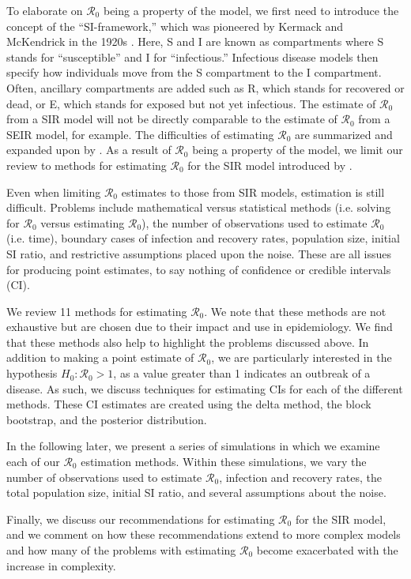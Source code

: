 \message{ !name(draft_v13.tex)}\documentclass[12pt]{article}
\newcommand{\wxxsir}{11 }
\newcommand{\rr}{\ensuremath{\mathcal{R}_0}}
\begin{document}
To elaborate on $\rr$ being a property of the model, we first need to introduce the concept of the ``SI-framework,'' which was pioneered by Kermack and McKendrick in the 1920s \citep{getz2006}.   Here, S and I are known as compartments where S stands for ``susceptible'' and I for ``infectious.'' Infectious disease models then specify how individuals move from the S compartment to the I compartment.  Often, ancillary compartments are added such as R, which stands for recovered or dead, or E, which stands for exposed but not yet infectious.  The estimate of $\rr$ from a SIR model will not be directly comparable to the estimate of $\rr$ from a SEIR model, for example.  The difficulties of estimating $\rr$ are summarized and expanded upon by \cite{li2011}.   As a result of $\rr$ being a property of the model, we limit our review to methods for estimating $\rr$ for the SIR model introduced by \cite{Kermack700}.

Even when limiting $\rr$ estimates to those from SIR models, estimation is still difficult.  Problems include mathematical versus statistical methods (i.e. solving for $\rr$ versus estimating $\rr$), the number of observations used to estimate $\rr$ (i.e. time), boundary cases of infection and recovery rates, population size, initial SI ratio, and restrictive assumptions placed upon the noise.  These are all issues for producing point estimates, to say nothing of confidence or credible intervals (CI).

We review \wxxsir methods for estimating $\rr$.  We note that these methods are not exhaustive but are chosen due to their impact and use in epidemiology.  We find that these methods also help to highlight the problems discussed above.  In addition to making a point estimate of $\rr$, we are particularly interested in the hypothesis  $H_0: \rr > 1$, as a value greater than 1 indicates an outbreak of a disease.  As such, we discuss techniques for estimating CIs for each of the different methods.  These CI estimates are created using the delta method, the block bootstrap, and the posterior distribution.

In the following later, we present a series of simulations in which we examine each of our $\rr$ estimation methods.  Within these simulations, we vary the number of observations used to estimate $\rr$, infection and recovery rates, the total population size, initial SI ratio, and several assumptions about the noise.


Finally, we discuss our recommendations for estimating $\rr$ for the SIR model, and we comment on how these recommendations extend to more complex models and how many of the problems with estimating $\rr$  become exacerbated with the increase in complexity.
\end{document}
